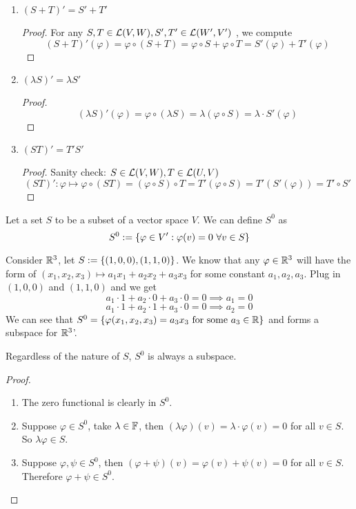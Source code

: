 \begin{remark} $ $
    \vspace{-0.5cm}
    \begin{enumerate}
        \item $(S + T)'  = S' + T'$
        \begin{proof}
            For any $S,T \in \mathcal L(V,W), S', T' \in \mathcal L(W',V')$ , we compute 
            \[(S + T)'(\varphi) = \varphi \circ (S + T) = \varphi \circ S + \varphi \circ T = S'(\varphi) + T'(\varphi)\]
        \end{proof}
        \item $(\lambda S)' = \lambda S'$
        \begin{proof}
            \[ (\lambda S)'(\varphi) = \varphi \circ (\lambda S) = \lambda (\varphi \circ S) = \lambda \cdot S'(\varphi)\]
        \end{proof}
        \item $(ST)'  = T' S'$
        \begin{proof}
            Sanity check: $S \in \mathcal L(V,W), T \in \mathcal L(U,V)$
            \[ (ST)' : \varphi \mapsto \varphi 
            \circ (ST) = (\varphi \circ S) \circ T = T'(\varphi \circ S) = T'(S'(\varphi)) = T' \circ S'\]
        \end{proof}
    \end{enumerate}
\end{remark}
\begin{definition}[Annihilators]
    Let a set $S$ to be a subset of a vector space $V$. We can define $S^0$ as 
    \[ S^0 := \left\{ \varphi \in V' : \varphi (v) = 0 \ \forall v \in S \right\}\]
\end{definition}
\begin{example}
    Consider $\mathbb R^3$, let $S := \left\{ (1,0,0), (1,1,0) \right\}$. We know that any $\varphi \in \mathbb R^3$ will have the form of $(x_1,x_2,x_3) \mapsto a_1x_1 + a_2x_2 + a_3x_3$ for some constant $a_1,a_2,a_3$. Plug in $(1,0,0)$ and $(1,1,0)$ and we get 
    \[ a_1 \cdot 1 + a_2 \cdot 0 + a_3 \cdot 0 = 0 \implies a_1 = 0\]
    \[ a_1 \cdot 1 + a_2 \cdot 1 + a_3 \cdot 0 = 0 \implies a_2 = 0\]
    We can see that $S^{0} = \left\{ \varphi(x_1, x_2, x_3) = a_3 x_3 \text{ for some } a_3 \in \mathbb R \right\}$ and forms a subspace for $\mathbb R^{3}$'.
\end{example}
\begin{lemma}
    Regardless of the nature of $S$, $S^0$ is always a subspace.
\end{lemma}
\begin{proof}
    \begin{enumerate}
        \item The zero functional is clearly in $S^0$.
        \item Suppose $\varphi \in S^0$, take $\lambda \in \mathbb F$, then $(\lambda \varphi)(v) = \lambda \cdot \varphi(v) = 0$ for all $v \in S$. So $\lambda \varphi \in S$.
        \item Suppose $\varphi, \psi \in S^0$, then $(\varphi + \psi)(v) = \varphi(v) + \psi(v) = 0$ for all $v \in S$. Therefore $\varphi + \psi \in S^0$.
    \end{enumerate}
\end{proof}
